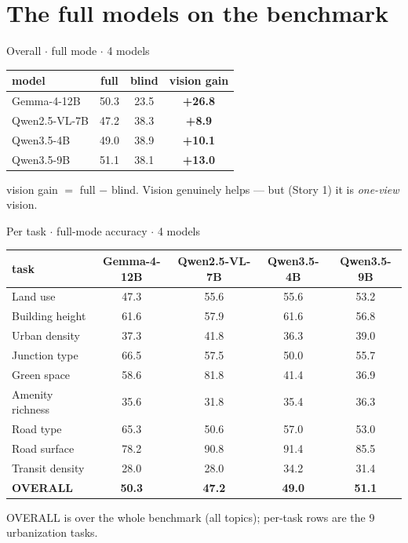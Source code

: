 \documentclass[aspectratio=169]{beamer}
\begin{document}
\section{The full models on the benchmark}
\begin{frame}{Overall \textbf{$\cdot$} full mode \textbf{$\cdot$} 4 models}
\centering
\begin{tabular}{lcc>{\bfseries}c}
\toprule
model & full & blind & vision gain \\
\midrule
Gemma-4-12B & 50.3 & 23.5 & \textcolor{good}{+26.8} \\
Qwen2.5-VL-7B & 47.2 & 38.3 & \textcolor{good}{+8.9} \\
Qwen3.5-4B & 49.0 & 38.9 & \textcolor{good}{+10.1} \\
Qwen3.5-9B & 51.1 & 38.1 & \textcolor{good}{+13.0} \\
\bottomrule
\end{tabular}
\vfill\footnotesize vision gain $=$ full $-$ blind. Vision genuinely helps --- but (Story 1) it is \emph{one-view} vision.
\end{frame}
\begin{frame}{Per task \textbf{$\cdot$} full-mode accuracy \textbf{$\cdot$} 4 models}
\centering\scriptsize
\begin{tabular}{lcccc}
\toprule
task & Gemma-4-12B & Qwen2.5-VL-7B & Qwen3.5-4B & Qwen3.5-9B \\
\midrule
Land use & 47.3 & 55.6 & 55.6 & 53.2 \\
Building height & 61.6 & 57.9 & 61.6 & 56.8 \\
Urban density & 37.3 & 41.8 & 36.3 & 39.0 \\
Junction type & 66.5 & 57.5 & 50.0 & 55.7 \\
Green space & 58.6 & 81.8 & 41.4 & 36.9 \\
Amenity richness & 35.6 & 31.8 & 35.4 & 36.3 \\
Road type & 65.3 & 50.6 & 57.0 & 53.0 \\
Road surface & 78.2 & 90.8 & 91.4 & 85.5 \\
Transit density & 28.0 & 28.0 & 34.2 & 31.4 \\
\midrule
\textbf{OVERALL} & \textbf{50.3} & \textbf{47.2} & \textbf{49.0} & \textbf{51.1} \\
\bottomrule
\end{tabular}
\vfill\footnotesize OVERALL is over the whole benchmark (all topics); per-task rows are the 9 urbanization tasks.
\end{frame}
\end{document}
